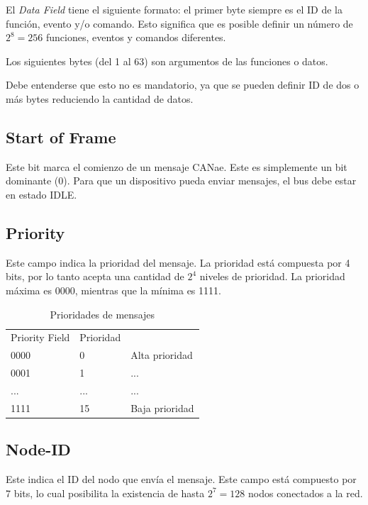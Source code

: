 El \textit{Data Field} tiene el siguiente formato: el primer byte siempre es
el ID de la función, evento y/o comando. Esto significa que es posible definir
un número de $2^8 = 256$ funciones, eventos y comandos diferentes.

Los siguientes bytes (del 1 al 63) son argumentos de las funciones o datos.

Debe entenderse que esto no es mandatorio, ya que se pueden definir ID de
dos o más bytes reduciendo la cantidad de datos.

\subsection{Start of Frame}
Este bit marca el comienzo de un mensaje CANae. Este es simplemente un bit
dominante (0). Para que un dispositivo pueda enviar mensajes, el bus debe estar
en estado IDLE.

\subsection{Priority}
Este campo indica la prioridad del mensaje. La prioridad está compuesta por 4
bits, por lo tanto acepta una cantidad de $2^4$ niveles de prioridad. La
prioridad máxima es 0000, mientras que la mínima es 1111.

\begin{table}[h!]
  \centering
  \caption{Prioridades de mensajes}
  \label{tab:prorities}

  \begin{tabular}{|l|l|l}
    \cline{1-2}
    Priority Field & Prioridad & \\ \cline{1-2}
    0000 & 0 & Alta prioridad \\ \cline{1-2}
    0001 & 1 & ... \\ \cline{1-2}
    ... & ... & ... \\ \cline{1-2}
    1111 & 15 & Baja prioridad \\ \cline{1-2}
  \end{tabular}
  
\end{table}

\subsection{Node-ID}
Este indica el ID del nodo que envía el mensaje. Este campo está compuesto por 7
bits, lo cual posibilita la existencia de hasta $2^7 = 128 $ nodos conectados
a la red.

